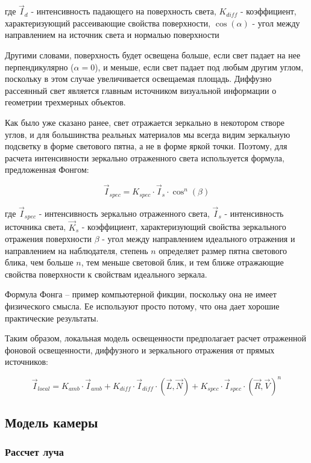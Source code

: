 \documentclass[12pt, a4paper]{article}
\begin{document}
где $\vec{I}_{d}$ - интенсивность падающего на поверхность света, $K_{diff}$ - коэффициент, характеризующий рассеивающие свойства поверхности, $\cos(\alpha)$ - угол между направлением на источник света и нормалью поверхности

Другими словами, поверхность будет освещена больше, если свет падает на нее перпендикулярно ($\alpha = 0$), и меньше, если свет падает под любым другим углом, поскольку в этом случае увеличивается освещаемая площадь. Диффузно рассеянный свет является главным источником визуальной информации о геометрии трехмерных объектов.

Как было уже сказано ранее, свет отражается зеркально в некотором створе углов, и для большинства реальных материалов мы всегда видим зеркальную подсветку в форме светового пятна, а не в форме яркой точки. Поэтому, для расчета интенсивности зеркально отраженного света используется формула, предложенная Фонгом:

$$
 \vec{I}_{spec} = K_{spec} \cdot \vec{I}_{s} \cdot \cos^n(\beta)
$$

где $\vec{I}_{spec}$ - интенсивность зеркально отраженного света,  $\vec{I}_{s}$ - интенсивность источника света,  $\vec{K}_{s}$ - коэффициент, характеризующий свойства зеркального отражения поверхности
$\beta$ - угол между направлением идеального отражения и направлением на наблюдателя, степень $n$ определяет размер пятна светового блика, чем больше $n$, тем меньше световой блик, и тем ближе отражающие свойства поверхности к свойствам идеального зеркала.

Формула Фонга – пример компьютерной фикции, поскольку она не имеет физического смысла. Ее используют просто потому, что она дает хорошие практические результаты. 

Таким образом, локальная модель освещенности предполагает расчет отраженной фоновой освещенности, диффузного и зеркального отражения от прямых источников: 

$$
 \vec{I}_{local} =  K_{amb} \cdot \vec{I}_{amb} +  K_{diff} \cdot \vec{I}_{diff} \cdot \left( \vec{L},\vec{N} \right) + K_{spec} \cdot \vec{I}_{spec} \cdot \left( \vec{R},\vec{V} \right)^n
$$


\subsection{Модель камеры}

\subsubsection{Рассчет луча}
\end{document}
